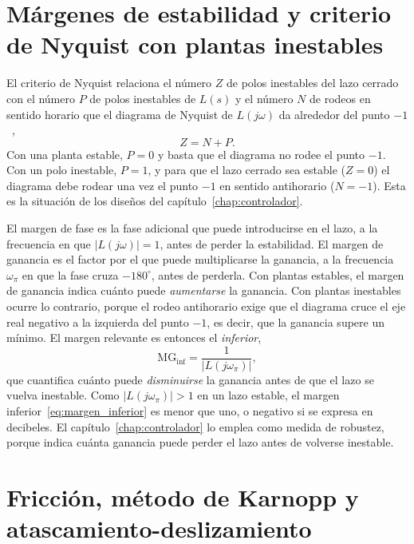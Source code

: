 \section{Márgenes de estabilidad y criterio de Nyquist con plantas inestables}\label{sec:fund_nyquist}

El criterio de Nyquist relaciona el número $Z$ de polos inestables del lazo cerrado con el número $P$ de polos inestables de $L(s)$ y el número $N$ de rodeos en sentido horario que el diagrama de Nyquist de $L(j\omega)$ da alrededor del punto $-1$~\cite{gene},
\begin{equation}
Z=N+P .
\label{eq:nyquist}
\end{equation}
Con una planta estable, $P=0$ y basta que el diagrama no rodee el punto $-1$. Con un polo inestable, $P=1$, y para que el lazo cerrado sea estable ($Z=0$) el diagrama debe rodear una vez el punto $-1$ en sentido antihorario ($N=-1$). Esta es la situación de los diseños del capítulo~\ref{chap:controlador}.

El margen de fase es la fase adicional que puede introducirse en el lazo, a la frecuencia en que $|L(j\omega)|=1$, antes de perder la estabilidad. El margen de ganancia es el factor por el que puede multiplicarse la ganancia, a la frecuencia $\omega_\pi$ en que la fase cruza $-180^\circ$, antes de perderla. Con plantas estables, el margen de ganancia indica cuánto puede \emph{aumentarse} la ganancia. Con plantas inestables ocurre lo contrario, porque el rodeo antihorario exige que el diagrama cruce el eje real negativo a la izquierda del punto $-1$, es decir, que la ganancia supere un mínimo. El margen relevante es entonces el \emph{inferior},
\begin{equation}
\mathrm{MG}_{\inf}=\frac{1}{|L(j\omega_\pi)|} ,
\label{eq:margen_inferior}
\end{equation}
que cuantifica cuánto puede \emph{disminuirse} la ganancia antes de que el lazo se vuelva inestable. Como $|L(j\omega_\pi)|>1$ en un lazo estable, el margen inferior~\eqref{eq:margen_inferior} es menor que uno, o negativo si se expresa en decibeles. El capítulo~\ref{chap:controlador} lo emplea como medida de robustez, porque indica cuánta ganancia puede perder el lazo antes de volverse inestable.

\section{Fricción, método de Karnopp y atascamiento-deslizamiento}\label{sec:fund_friccion}

